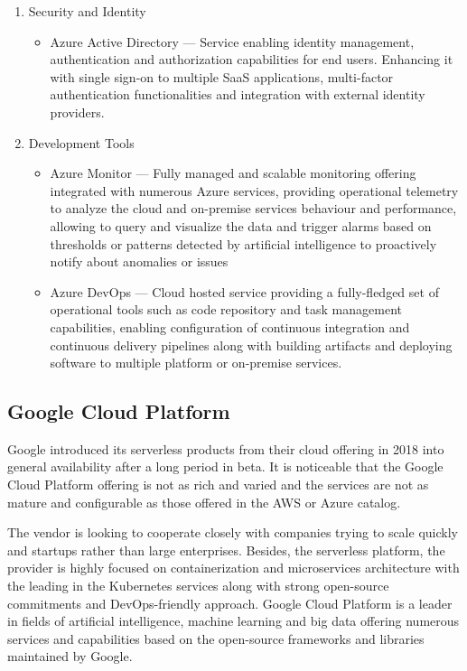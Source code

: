 \begin{enumerate}
   \item Security and Identity
   \begin{itemize}
       \item Azure Active Directory --- Service enabling identity management, authentication and authorization capabilities for end users. Enhancing it with single sign-on to multiple SaaS applications, multi-factor authentication functionalities and integration with external identity providers.
   \end{itemize}
   \item Development Tools
   \begin{itemize}
       \item Azure Monitor --- Fully managed and scalable monitoring offering integrated with numerous Azure services, providing operational telemetry to analyze the cloud and on-premise services behaviour and performance, allowing to query and visualize the data and trigger alarms based on thresholds or patterns detected by artificial intelligence to proactively notify about anomalies or issues
       \item Azure DevOps --- Cloud hosted service providing a fully-fledged set of operational tools such as code repository and task management capabilities, enabling configuration of continuous integration and continuous delivery pipelines along with building artifacts and deploying software to multiple platform or on-premise services.
   \end{itemize}
\end{enumerate}

\subsection{Google Cloud Platform}

Google introduced its serverless products from their cloud offering in 2018 into general availability after a long period in beta. It is noticeable that the Google Cloud Platform offering is not as rich and varied and the services are not as mature and configurable as those offered in the AWS or Azure catalog.

The vendor is looking to cooperate closely with companies trying to scale quickly and startups rather than large enterprises. Besides, the serverless platform, the provider is highly focused on containerization and microservices architecture with the leading in the Kubernetes services along with strong open-source commitments and DevOps-friendly approach. Google Cloud Platform is a leader in fields of artificial intelligence, machine learning and big data offering numerous services and capabilities based on the open-source frameworks and libraries maintained by Google.

